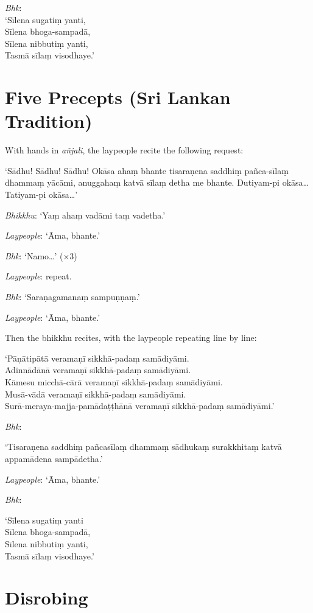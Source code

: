 \emph{Bhk}:\\
‘Sīlena sugatiṃ yanti,\\
Sīlena bhoga-sampadā,\\
Sīlena nibbutiṃ yanti,\\
Tasmā sīlaṃ visodhaye.’

\section{Five Precepts (Sri Lankan Tradition)}

With hands in \emph{añjali}, the laypeople recite the following request:

‘Sādhu! Sādhu! Sādhu! Okāsa ahaṃ bhante tisaraṇena saddhiṃ pañca-sīlaṃ dhammaṃ
yācāmi, anuggahaṃ katvā sīlaṃ detha me bhante. Dutiyam-pi okāsa… Tatiyam-pi
okāsa…’

\emph{Bhikkhu}: ‘Yaṃ ahaṃ vadāmi taṃ vadetha.’

\emph{Laypeople}: ‘Āma, bhante.’

\emph{Bhk}: ‘Namo…’ (×3)

\emph{Laypeople}: repeat.

\emph{Bhk}: ‘Saraṇagamanaṃ sampuṇṇaṃ.’

\emph{Laypeople}: ‘Āma, bhante.’

Then the bhikkhu recites, with the laypeople repeating line by line:

‘Pāṇātipātā veramaṇī sikkhā-padaṃ samādiyāmi.\\
Adinnādānā veramaṇī sikkhā-padaṃ samādiyāmi.\\
Kāmesu micchā-cārā veramaṇī sikkhā-padaṃ samādiyāmi.\\
Musā-vādā veramaṇī sikkhā-padaṃ samādiyāmi.\\
Surā-meraya-majja-pamādaṭṭhānā veramaṇī sikkhā-padaṃ samādiyāmi.’


\emph{Bhk}:

‘Tisaraṇena saddhiṃ pañcasīlaṃ dhammaṃ sādhukaṃ surakkhitaṃ katvā appamādena
sampādetha.’

\emph{Laypeople}: ‘Āma, bhante.’

\emph{Bhk}:

‘Sīlena sugatiṃ yanti\\
Sīlena bhoga-sampadā,\\
Sīlena nibbutiṃ yanti,\\
Tasmā sīlaṃ visodhaye.’

\section{Disrobing}

